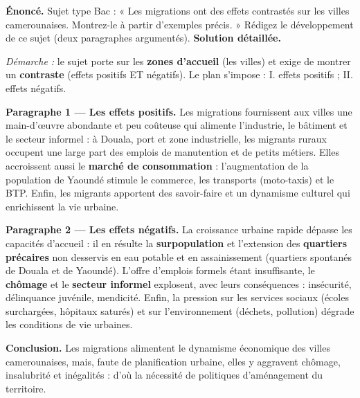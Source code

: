 \documentclass[11pt]{article}
\newcommand{\cle}[1]{{\popxbold\color{popdark}#1}}
\begin{document}
\begin{exoresolu}
\textbf{Énoncé.} Sujet type Bac : « Les migrations ont des effets contrastés sur les villes camerounaises. Montrez-le à partir d'exemples précis. » Rédigez le développement de ce sujet (deux paragraphes argumentés).
\tcblower
\textbf{Solution détaillée.}

\emph{Démarche :} le sujet porte sur les \textbf{zones d'accueil} (les villes) et exige de montrer un \textbf{contraste} (effets positifs ET négatifs). Le plan s'impose : I. effets positifs ; II. effets négatifs.

\textbf{Paragraphe 1 — Les effets positifs.} Les migrations fournissent aux villes une \cle{main-d'œuvre} abondante et peu coûteuse qui alimente l'industrie, le bâtiment et le secteur informel : à Douala, port et zone industrielle, les migrants ruraux occupent une large part des emplois de manutention et de petits métiers. Elles accroissent aussi le \textbf{marché de consommation} : l'augmentation de la population de Yaoundé stimule le commerce, les transports (moto-taxis) et le BTP. Enfin, les migrants apportent des savoir-faire et un dynamisme culturel qui enrichissent la vie urbaine.

\textbf{Paragraphe 2 — Les effets négatifs.} La croissance urbaine rapide dépasse les capacités d'accueil : il en résulte la \textbf{surpopulation} et l'extension des \textbf{quartiers précaires} non desservis en eau potable et en assainissement (quartiers spontanés de Douala et de Yaoundé). L'offre d'emplois formels étant insuffisante, le \textbf{chômage} et le \textbf{secteur informel} explosent, avec leurs conséquences : insécurité, délinquance juvénile, mendicité. Enfin, la pression sur les services sociaux (écoles surchargées, hôpitaux saturés) et sur l'environnement (déchets, pollution) dégrade les conditions de vie urbaines.

\textbf{Conclusion.} Les migrations alimentent le dynamisme économique des villes camerounaises, mais, faute de planification urbaine, elles y aggravent chômage, insalubrité et inégalités : d'où la nécessité de politiques d'aménagement du territoire.
\end{exoresolu}
\end{document}
